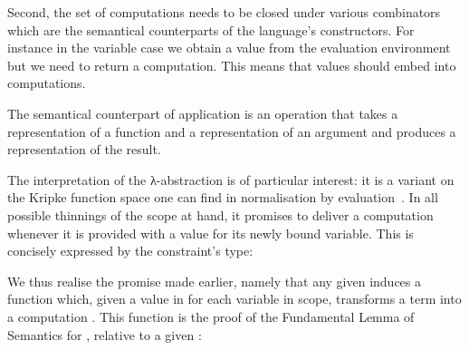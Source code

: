 \begin{agdasnippet}
\addtolength{\leftskip}{\parindent}
\end{agdasnippet}
Second, the set of computations needs to be closed under various
combinators which are the semantical counterparts of the language's
constructors.
For instance in the variable case we obtain a value from the evaluation
environment but we need to return a computation. This means that values
should embed into computations.

\begin{agdasnippet}
\addtolength{\leftskip}{\parindent}
\end{agdasnippet}
The semantical counterpart of application is an operation that takes a
representation of a function and a representation of an argument and
produces a representation of the result.

\begin{agdasnippet}
\addtolength{\leftskip}{\parindent}
\end{agdasnippet}
The interpretation of the λ-abstraction is of particular interest:
it is a variant on the Kripke function space one can find in normalisation
by evaluation~\cite{berger1991inverse,berger1993program,CoqDybSK,coquand2002formalised}.
In all possible thinnings of the scope at hand, it promises
to deliver a computation whenever it is provided with a value for its newly
bound variable. This is concisely expressed by the constraint's type:

\begin{agdasnippet}
\addtolength{\leftskip}{\parindent}
\end{agdasnippet}


We thus realise the promise made earlier, namely that any given
{\semrec{}  } induces
a function which, given a value in  for each variable in scope,
transforms a   term into a computation . This function is the proof of the Fundamental Lemma of Semantics for , relative to a given \semrec{}  :
\begin{center}
\end{center}


